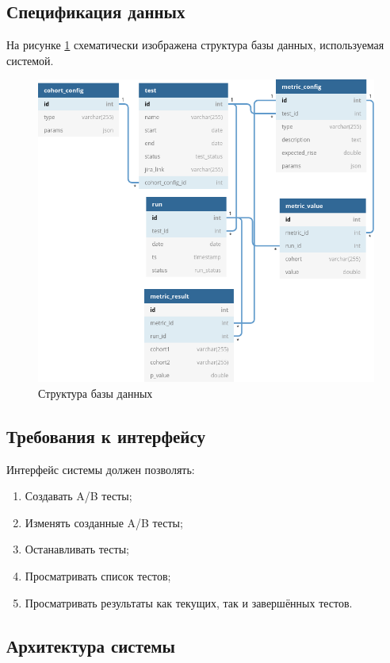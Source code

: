 \documentclass[../document.tex]{subfiles}
\begin{document}
	\subsection{Спецификация данных}
	\par На рисунке \ref{image:db_plot} схематически изображена структура базы данных, используемая системой.
	\begin{figure}[h] 
		\includegraphics[width=\linewidth]{A_B v.3.0.png}
		\caption{\label{image:db_plot}Структура базы данных}
	\end{figure}
	\subsection{Требования к интерфейсу}
	\par Интерфейс системы должен позволять:
	\begin{enumerate}
		\item Создавать A/B тесты;
		\item Изменять созданные A/B тесты;
		\item Останавливать тесты;
		\item Просматривать список тестов;
		\item Просматривать результаты как текущих, так и завершённых тестов.
	\end{enumerate}
	\subsection{Архитектура системы}
\end{document}
